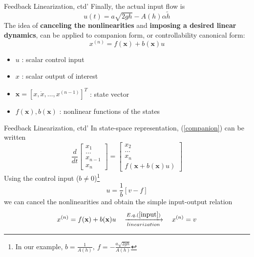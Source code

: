 \documentclass{beamer}
\begin{document}
  \begin{frame}{Feedback Linearization, ctd'}
  Finally, the actual input flow is
  $$ u(t) = a\sqrt{2gh} - A(h)\alpha \widetilde{h} $$ 
    The idea of \textbf{canceling the nonlinearities} and \textbf{imposing a desired linear dynamics}, can be applied to {\color{red}companion form, or controllability canonical form}:
    \begin{equation}\label{companion}
      x^{(n)} = f(\textbf{x}) + b(\textbf{x})u
    \end{equation}
    \vspace{-20pt}
    \begin{itemize}
      \item $u$ : scalar control input
      \item $x$ : scalar output of interest
      \item $\textbf{x} = \left[ x,\dot{x},\dots,x^{(n-1)}\right]^{T}$ : state vector
      \item $f(\textbf{x}), b(\textbf{x})$ : nonlinear functions of the states
    \end{itemize}
  \end{frame}


  \begin{frame}{Feedback Linearization, ctd'}
  In state-space representation, (\ref{companion}) can be written
  $$
  \frac{d}{dt}\left[\begin{array}{c}
                      x_{1} \\
                      \dots \\
                      x_{n-1} \\
                      x_{n}
                    \end{array}\right] = \left[\begin{array}{c}
                                                 x_{2} \\
                                                 \dots \\
                                                 x_{n} \\
                                                 f(\textbf{x}+b(\textbf{x})u)
                                               \end{array}\right]
  $$
  Using the control input ($b \neq 0$)\footnote{In our example, $b=\frac{1}{A(h)}, ~ f=-\frac{a\sqrt{2gh}}{A(h)}$}
  \begin{equation}\label{input}
    u = \frac{1}{b}\left[v-f\right]
  \end{equation}
  we can cancel the nonlinearities and obtain the simple input-output relation
  $$ x^{(n)} = f(\textbf{x}) + b(\textbf{x})u \quad \xrightarrow[linearization]{E.q.(\ref{input})} \quad x^{(n)} = v $$
  \end{frame}
\end{document}
